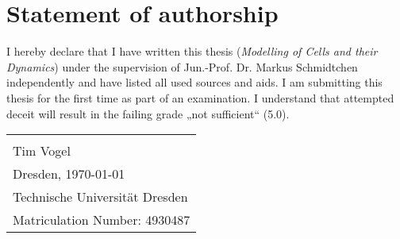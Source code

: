 \documentclass[a4paper,12pt,leqno]{article}
\theoremstyle{plain}
\theoremstyle{remark}
\newcommand{\thema}{Modelling of Cells and their Dynamics}
\newcommand{\datum}{\today} %
\begin{document}
\newpage



\newpage
\section*{Statement of authorship}
\thispagestyle{empty}

I hereby declare that I have written this thesis (\emph{\thema}) under the supervision of Jun.-Prof. Dr. Markus Schmidtchen independently  and have listed all used sources and aids. I am submitting this thesis for the first time as part of an examination. I understand that attempted deceit will result in the failing grade „not sufficient“ (5.0). \\
\bigskip


\bigskip \bigskip  

\vspace{10mm}
\begin{tabular}{@{}p{2.5in}@{}}
	\hrulefill \\
	Tim Vogel\\
	Dresden, \datum\  \\
	Technische Universität Dresden \\
	Matriculation Number: 4930487 \\
\end{tabular}


\normalsize
\end{document}
